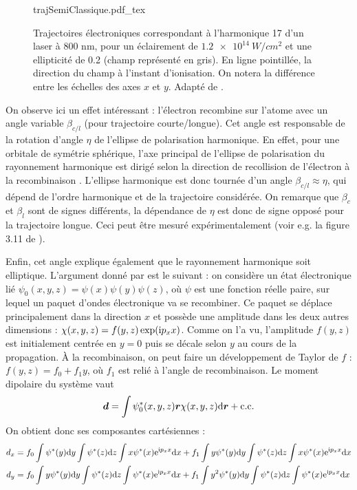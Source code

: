 \begin{figure}[!ht]
\centering
\def\svgwidth{0.7\columnwidth}
{trajSemiClassique.pdf_tex}
\caption{Trajectoires électroniques correspondant à l’harmonique 17 d'un laser à 800 nm, pour un éclairement de $\SI{1.2e14}{W/cm^2}$ et une ellipticité de 0.2 (champ représenté en gris).
En ligne pointillée, la direction du champ à l’instant d’ionisation. On notera la différence entre les échelles
des axes $x$ et $y$. Adapté de .}
\label{fig:ellhiguet}
\end{figure}

On observe ici un effet intéressant : l'électron recombine sur l'atome avec un angle variable $\beta_{c/l}$ (pour trajectoire courte/longue). Cet angle est responsable de la rotation d'angle $\eta$ de l'ellipse de polarisation harmonique. En effet, pour une orbitale de symétrie sphérique, l'axe principal de l'ellipse de polarisation du rayonnement harmonique est dirigé selon la direction de recollision de l'électron à la recombinaison . L'ellipse harmonique est donc tournée d'un angle $\beta_{c/l}\approx\eta$, qui dépend de l'ordre harmonique et de la trajectoire considérée. On remarque que $\beta_c$ et $\beta_l$ sont de signes différents, la dépendance de $\eta$ est donc de signe opposé pour la trajectoire longue. Ceci peut être mesuré expérimentalement (voir e.g. la figure 3.11 de ).\par
Enfin, cet angle explique également que le rayonnement harmonique soit elliptique. L'argument donné par  est le suivant : on considère un état électronique lié $\psi_0(x,y,z) = \psi(x)\psi(y)\psi(z)$, où $\psi$ est une fonction réelle paire, sur lequel un paquet d'ondes électronique va se recombiner. Ce paquet se déplace principalement dans la direction $x$ et possède une amplitude dans les deux autres dimensions : $\chi(x,y,z) = f(y,z)\exp(\mathrm{i} p_x x)$. Comme on l'a vu, l'amplitude $f(y,z)$ est initialement centrée en $y=0$ puis se décale selon $y$ au cours de la propagation. \`{A} la recombinaison, on peut faire un développement de Taylor de $f$ : $f(y,z) = f_0 + f_1 y$, où $f_1$ est relié à l'angle de recombinaison. Le moment dipolaire du système vaut 
\begin{equation}
\bm{d} = \int{\psi_0^*(x,y,z) \bm{r} \chi(x,y,z) \mathrm{d}\bm{r}} + \text{c.c.}
\end{equation}
On obtient donc ses composantes cartésiennes :
\begin{align}
d_x &= f_0\int{\psi^*(y)\mathrm{d}y}\int{\psi^*(z)\mathrm{d}z}\int{x\psi^*(x)\mathrm{e}^{\mathrm{i}p_x x}\mathrm{d}x} + 
f_1\int{y \psi^*(y)\mathrm{d}y}\int{\psi^*(z)\mathrm{d}z}\int{x\psi^*(x)\mathrm{e}^{\mathrm{i}p_x x}\mathrm{d}x}\nonumber\\
d_y &= f_0\int{y \psi^*(y)\mathrm{d}y}\int{\psi^*(z)\mathrm{d}z}\int{\psi^*(x)\mathrm{e}^{\mathrm{i}p_x x}\mathrm{d}x} + 
f_1\int{y^2 \psi^*(y)\mathrm{d}y}\int{\psi^*(z)\mathrm{d}z}\int{\psi^*(x)\mathrm{e}^{\mathrm{i}p_x x}\mathrm{d}x}
\end{align}

